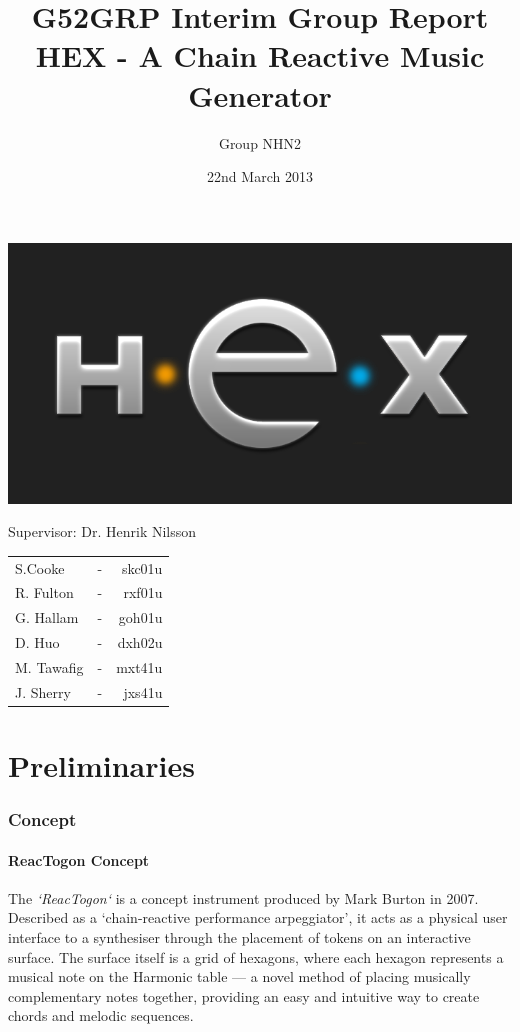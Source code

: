 \documentclass[10pt,a4paper]{article}
\begin{document}
\begin{titlepage}
\title{G52GRP Interim Group Report\\HEX - A Chain Reactive Music Generator }
\author{Group NHN2}
\includegraphics[scale=0.6]{hexlogo.png}
\date{22nd March 2013}
\maketitle
\thispagestyle{empty}
\begin{center}
Supervisor: Dr. Henrik Nilsson\\
\bigskip
\begin{tabular}{ l c r }
  S.Cooke & - & skc01u \\
  R. Fulton & - & rxf01u \\
  G. Hallam & - & goh01u \\
  D. Huo & - & dxh02u \\
  M. Tawafig & - & mxt41u \\
  J. Sherry & - & jxs41u \\  
\end{tabular}
\end{center}
\end{titlepage}

\tableofcontents
\pagebreak

\part{Preliminaries}
\section{Concept}
\subsection{ReacTogon Concept}
The \textit{`ReacTogon`}\cite{modin} is a concept instrument produced by Mark Burton in 2007. Described as a `chain-reactive performance arpeggiator', it acts as a physical user interface to a synthesiser through the placement of tokens on an interactive surface. The surface itself is a grid of hexagons, where each hexagon represents a musical note on the Harmonic table\cite{wikipediaHarmTab} --- a novel method of placing musically complementary notes together, providing an easy and intuitive way to create chords and melodic sequences.\\
\end{document}
